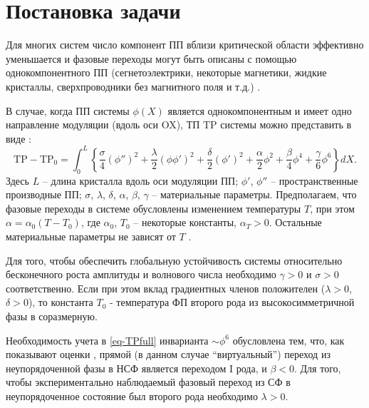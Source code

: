 
\chapter{Постановка задачи}\label{ch-task}

Для многих систем число компонент ПП вблизи критической области эффективно уменьшается и фазовые переходы могут быть описаны с помощью однокомпонентного ПП (сегнетоэлектрики, некоторые магнетики, жидкие кристаллы, сверхпроводники без магнитного поля и т.д.) \cite{Toledano1994, Izjumov1987, Buzdin1986}.

В случае, когда ПП системы $\phi(X)$ является однокомпонентным и имеет одно направление модуляции (вдоль оси OX), ТП $\mathrm{TP}$ системы  можно представить в виде \cite{Vysochanskii1994, Vysochanskii1990, Ema1990}:
\begin{equation}
\mathrm{TP} - \mathrm{TP}_0 = 
 	                      \int^L_0 \left\{\frac{\sigma}{4} \left( \phi'' \right)^2 + 
 	                      \frac{\lambda}{2}\left(\phi\phi'\right)^2 + 
 	                      \frac{\delta}{2}\left(\phi'\right)^2 +
 	                      \frac{\alpha}{2}\phi^2 + \frac{\beta}{4}\phi^4 + 
 	                      \frac{\gamma}{6}\phi^6
 	                      \right\} dX.
\label{eq-TPfull}
\end{equation}
Здесь  $L$ -- длина кристалла вдоль оси модуляции ПП;  $\phi'$, $\phi''$ -- пространственные производные ПП; $\sigma$, $\lambda$, $\delta$, $\alpha$, $\beta$, $\gamma$ -- материальные параметры.
Предполагаем, что фазовые переходы в системе обусловлены изменением температуры $T$, при этом $\alpha = \alpha_0(T-T_0)$, где $\alpha_0$, $T_0$ -- некоторые константы, $\alpha_T > 0$.
Остальные материальные параметры не зависят от $T$ \cite{Vysochanskii1994}.

Для того, чтобы обеспечить глобальную устойчивость системы относительно бесконечного роста амплитуды и волнового числа необходимо $\gamma > 0$ и $\sigma > 0$ соответственно.
Если при этом вклад градиентных членов положителен ($\lambda >0$, $\delta > 0$), то константа $T_0$ - температура ФП второго рода из высокосимметричной фазы в соразмерную.

Необходимость учета в \ref{eq-TPfull} инварианта $\sim\phi^6$ обусловлена тем, что, как показывают оценки \cite{Vysochanskii1994}, прямой (в данном случае ``виртуальный'') переход из неупорядоченной фазы в НСФ является переходом I рода, и $\beta < 0$.
Для того, чтобы экспериментально наблюдаемый фазовый переход из СФ в неупорядоченное состояние  был второго рода необходимо $\lambda > 0$.

